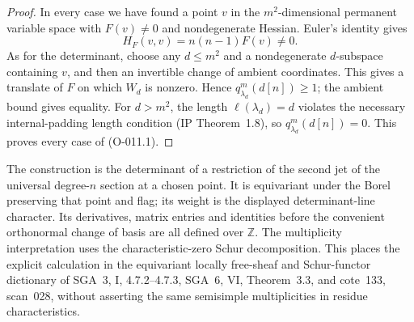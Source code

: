 \begin{proof}
In every case we have found a point $v$ in the $m^2$-dimensional
permanent variable space with $F(v)\ne0$ and nondegenerate Hessian.
Euler's identity gives
\[
                          H_F(v,v)=n(n-1)F(v)\ne0.
\]
As for the determinant, choose any $d\leq m^2$ and a
nondegenerate $d$-subspace containing $v$, and then an invertible
change of ambient coordinates. This gives a translate of $F$
on which $W_d$ is nonzero. Hence $q^m_{\lambda_d}(d[n])\geq1$;
the ambient bound gives equality. For $d>m^2$, the length
$\ell(\lambda_d)=d$ violates the necessary internal-padding
length condition (IP Theorem~1.8), so $q^m_{\lambda_d}(d[n])=0$.
This proves every case of (O-011.1).
\end{proof}

The construction is the determinant of a restriction of the second
jet of the universal degree-$n$ section at a chosen point. It is
equivariant under the Borel preserving that point and flag; its
weight is the displayed determinant-line character. Its derivatives,
matrix entries and identities before the convenient orthonormal
change of basis are all defined over $\mathbb Z$. The multiplicity
interpretation uses the characteristic-zero Schur decomposition.
This places the explicit calculation in the equivariant locally
free-sheaf and Schur-functor dictionary of SGA~3, I, 4.7.2--4.7.3,
SGA~6, VI, Theorem~3.3, and cote~133, scan~028, without asserting
the same semisimple multiplicities in residue characteristics.

